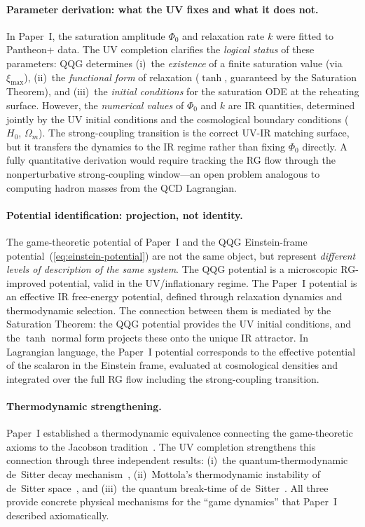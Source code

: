 \documentclass[aps,prd,twocolumn,superscriptaddress,nofootinbib]{revtex4-2}
\begin{document}
\paragraph{Parameter derivation: what the UV fixes and what it does not.}
In Paper~I, the saturation amplitude $\Phi_0$ and relaxation rate $k$ were fitted to Pantheon+ data. The UV completion clarifies the \textit{logical status} of these parameters: QQG determines (i)~the \textit{existence} of a finite saturation value (via $\xi_\mathrm{max}$), (ii)~the \textit{functional form} of relaxation ($\tanh$, guaranteed by the Saturation Theorem), and (iii)~the \textit{initial conditions} for the saturation ODE at the reheating surface. However, the \textit{numerical values} of $\Phi_0$ and $k$ are IR quantities, determined jointly by the UV initial conditions and the cosmological boundary conditions ($H_0$, $\Omega_m$). The strong-coupling transition is the correct UV-IR matching surface, but it transfers the dynamics to the IR regime rather than fixing $\Phi_0$ directly. A fully quantitative derivation would require tracking the RG flow through the nonperturbative strong-coupling window---an open problem analogous to computing hadron masses from the QCD Lagrangian.

\paragraph{Potential identification: projection, not identity.}
The game-theoretic potential of Paper~I and the QQG Einstein-frame potential~(\ref{eq:einstein-potential}) are not the same object, but represent \textit{different levels of description of the same system}. The QQG potential is a microscopic RG-improved potential, valid in the UV/inflationary regime. The Paper~I potential is an effective IR free-energy potential, defined through relaxation dynamics and thermodynamic selection. The connection between them is mediated by the Saturation Theorem: the QQG potential provides the UV initial conditions, and the $\tanh$ normal form projects these onto the unique IR attractor. In Lagrangian language, the Paper~I potential corresponds to the effective potential of the scalaron in the Einstein frame, evaluated at cosmological densities and integrated over the full RG flow including the strong-coupling transition.

\paragraph{Thermodynamic strengthening.}
Paper~I established a thermodynamic equivalence connecting the game-theoretic axioms to the Jacobson tradition~\cite{Jacobson1995}. The UV completion strengthens this connection through three independent results: (i)~the quantum-thermodynamic de~Sitter decay mechanism~\cite{Alicki2023,Alicki2025}, (ii)~Mottola's thermodynamic instability of de~Sitter space~\cite{Mottola1985,Mottola1986}, and (iii)~the quantum break-time of de~Sitter~\cite{DvaliGomezZell2017}. All three provide concrete physical mechanisms for the ``game dynamics'' that Paper~I described axiomatically.
\end{document}
